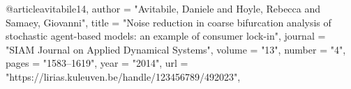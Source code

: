 @article{avitabile14,
  author = "Avitabile, Daniele and Hoyle, Rebecca and Samaey, Giovanni",
  title = "Noise reduction in coarse bifurcation analysis of stochastic agent-based models: an example of consumer lock-in",
  journal = "SIAM Journal on Applied Dynamical Systems",
  volume = "13",
  number = "4",
  pages = "1583--1619",
  year = "2014",
  url = "https://lirias.kuleuven.be/handle/123456789/492023",
}